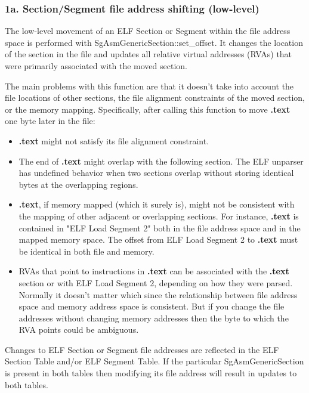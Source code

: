 \subsubsection{1a. Section/Segment file address shifting (low-level)}

   The low-level movement of an ELF Section or Segment within the file address space is performed with
   SgAsmGenericSection::set\_offset.  It changes the location of the section in the file and updates all relative virtual
   addresses (RVAs) that were primarily associated with the moved section.

   The main problems with this function are that it doesn't take into account the file locations of other sections, the file
   alignment constraints of the moved section, or the memory mapping. Specifically, after calling this function to move {\bf.text}
   one byte later in the file:
\begin{itemize}
   \item {\bf.text} might not satisfy its file alignment constraint.

   \item The end of {\bf.text} might overlap with the following section. The ELF unparser has undefined behavior when two sections
     overlap without storing identical bytes at the overlapping regions.

   \item {\bf.text}, if memory mapped (which it surely is), might not be consistent with the mapping of other adjacent or overlapping
     sections. For instance, {\bf.text} is contained in "ELF Load Segment 2" both in the file address space and in the mapped
     memory space. The offset from ELF Load Segment 2 to {\bf.text} must be identical in both file and memory.

   \item RVAs that point to instructions in {\bf.text} can be associated with the {\bf.text} section or with ELF Load Segment 2,
     depending on how they were parsed. Normally it doesn't matter which since the relationship between file address space and
     memory address space is consistent. But if you change the file addresses without changing memory addresses then the byte
     to which the RVA points could be ambiguous.
\end{itemize}

   Changes to ELF Section or Segment file addresses are reflected in the ELF Section Table and/or ELF Segment Table. If the
   particular SgAsmGenericSection is present in both tables then modifying its file address will result in updates to both
   tables.

